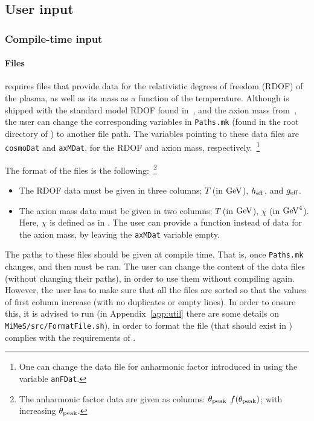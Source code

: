 \documentclass[11pt,a4paper]{article}
\begin{document}
\subsection{User input}\label{sec:input}
%
\subsubsection{Compile-time input}\label{sec:compile_time_input} 
%
\paragraph{Files} \mimes requires files that provide data for the relativistic degrees of freedom (RDOF) of the plasma, as well as its mass as a function of the temperature. Although \mimes is shipped with the standard model RDOF found in~\cite{Saikawa:2020swg}, and the axion mass from~\cite{Borsanyi:2016ksw}, the user can change the corresponding variables in {\tt Paths.mk} (found in the root directory of \mimes) to another file path. The variables pointing to these data files are {\tt cosmoDat} and {\tt axMDat}, for the RDOF and axion mass, respectively.~\footnote{One can change the data file for anharmonic factor introduced in  using the variable {\tt anFDat}.}

The format of the files is the following:~\footnote{The anharmonic factor data are given as columns: $\theta_{\rm peak}{}$ $f(\theta_{\rm peak}{})$; with increasing $\theta_{\rm peak}{}$.} 
%
\begin{itemize}
	\item The RDOF data must be given in three columns; $T$ (in ${\rm GeV}$), $h_{\rm eff}{}$, and $g_{\rm eff}{}$.
	\item The axion mass data must be given in two columns; $T$ (in ${\rm GeV}$), $\chi$ (in ${\rm GeV}^4$). Here, $\chi$ is defined as in . 
	The user can provide a function instead of data for the axion mass, by leaving the  {\tt axMDat} variable empty. 
\end{itemize}
%
The paths to these files should be given at compile time. That is, once {\tt Paths.mk} changes,  and then  must be ran. The user can change the content of the data files (without changing their paths), in order to use them without compiling \mimes again. However, the user has to make sure that all the files are sorted so that the values of first column increase (with no duplicates or empty lines). In order to ensure this, it is advised to run  (in Appendix~\ref{app:util} there are some details on {\tt MiMeS/src/FormatFile.sh}), in order to format the file (that should exist in ) complies with the requirements of \mimes.
\end{document}
